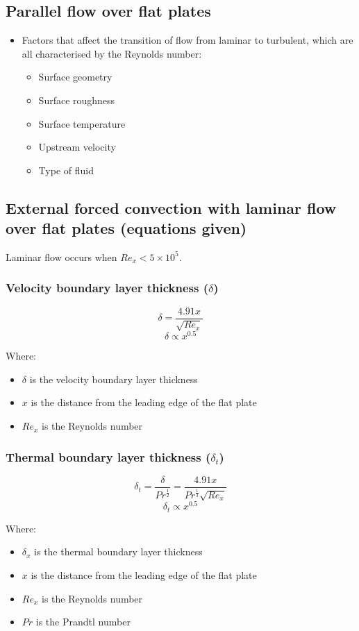 \documentclass[11pt]{article}
\begin{document}
\subsection{Parallel flow over flat plates}
\label{sec:orgdfaffab}
\begin{itemize}
\item Factors that affect the transition of flow from laminar to turbulent, which are all characterised by the Reynolds number:
\begin{itemize}
\item Surface geometry
\item Surface roughness
\item Surface temperature
\item Upstream velocity
\item Type of fluid
\end{itemize}
\end{itemize}

\subsection{External forced convection with laminar flow over flat plates (equations given)}
\label{sec:org57ac774}
Laminar flow occurs when \(Re_x < 5 \times 10^5\).

\subsubsection{Velocity boundary layer thickness (\(\delta\))}
\label{sec:orgf9380e6}
\[\delta = \frac{4.91 x}{\sqrt{Re_x}}\]
\[\delta \propto x^{0.5}\]

Where:
\begin{itemize}
\item \(\delta\) is the velocity boundary layer thickness
\item \(x\) is the distance from the leading edge of the flat plate
\item \(Re_x\) is the Reynolds number
\end{itemize}

\subsubsection{Thermal boundary layer thickness (\(\delta_t\))}
\label{sec:org1efa4c4}
\[\delta_t = \frac{\delta}{Pr^{\frac{1}{2}}} = \frac{4.91x}{Pr^{\frac{1}{3}} \sqrt{Re_x}}\]
\[\delta_t \propto x^{0.5}\]

Where:
\begin{itemize}
\item \(\delta_x\) is the thermal boundary layer thickness
\item \(x\) is the distance from the leading edge of the flat plate
\item \(Re_x\) is the Reynolds number
\item \(Pr\) is the Prandtl number
\end{itemize}
\end{document}
